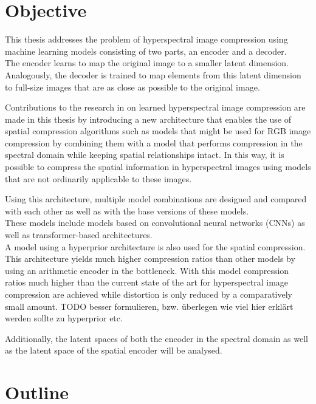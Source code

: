 \section{Objective\label{sec:objective}}

This thesis addresses the problem of hyperspectral image compression using machine learning models consisting of two parts, an encoder and a decoder.\\
The encoder learns to map the original image to a smaller latent dimension. Analogously, the decoder is trained to map elements from this latent dimension to full-size images that are as close as possible to the original image.

Contributions to the research in on learned hyperspectral image compression are made in this thesis by introducing a new architecture that enables the use of spatial compression algorithms such as models that might be used for RGB image compression by combining them with a model that performs compression in the spectral domain while keeping spatial relationships intact. In this way, it is possible to compress the spatial information in hyperspectral images using models that are not ordinarily applicable to these images.

Using this architecture, multiple model combinations are designed and compared with each other as well as with the base versions of these models.\\
These models include models based on convolutional neural networks (CNNs) as well as transformer-based architectures.\\
A model using a hyperprior architecture is also used for the spatial compression. This architecture yields much higher compression ratios than other models by using an arithmetic encoder in the bottleneck. With this model compression ratios much higher than the current state of the art for hyperspectral image compression are achieved while distortion is only reduced by a comparatively small amount. TODO besser formulieren, bzw. überlegen wie viel hier erklärt werden sollte zu hyperprior etc.

Additionally, the latent spaces of both the encoder in the spectral domain as well as the latent space of the spatial encoder will be analysed.

\section{Outline\label{sec:outline}}

